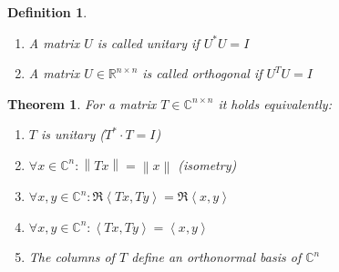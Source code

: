 \documentclass{article}
\newtheorem{theorem}{Theorem}  \numberwithin{theorem}{section}
\newtheorem{definition}{Definition}  \numberwithin{definition}{section}
\newcommand{\ip}[2]{\left\langle#1,#2\right\rangle} %
\newcommand{\norm}[1]{\left\|#1\right\|}
\begin{document}
\begin{definition} %
  \begin{enumerate}
    \item A matrix $U$ is called \emph{unitary} if $U^* U = I$
    \item A matrix $U \in \mathbb R^{n\times n}$ is called \emph{orthogonal} if $U^T U = I$
  \end{enumerate}
\end{definition}
\begin{theorem} %
  For a matrix $T \in \mathbb C^{n \times n}$ it holds equivalently:
  \begin{enumerate}
    \item $T$ is unitary ($T^* \cdot T = I$)
    \item $\forall x \in \mathbb C^n: \norm{Tx} = \norm{x}$ (isometry)
    \item $\forall x,y \in \mathbb C^n: \Re{\ip{Tx}{Ty}} = \Re{\ip xy}$
    \item $\forall x,y \in \mathbb C^n: \ip{Tx}{Ty} = \ip xy$
    \item The columns of $T$ define an orthonormal basis of $\mathbb C^n$
  \end{enumerate}
\end{theorem}
\end{document}
